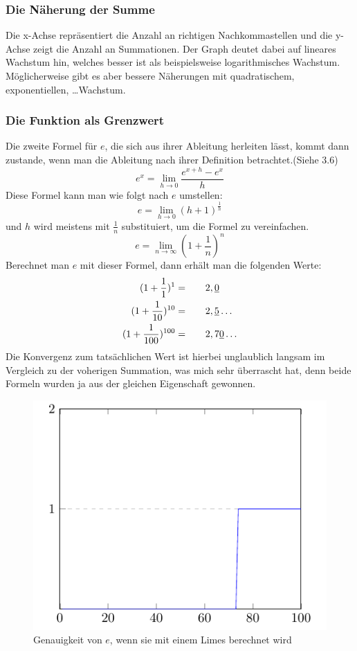 \subsubsection{Die Näherung der Summe}
\par Die x-Achse repräsentiert die Anzahl an richtigen Nachkommastellen und die y-Achse zeigt die Anzahl an Summationen. Der Graph deutet dabei auf lineares Wachstum hin, welches besser ist als beispielsweise logarithmisches Wachstum. Möglicherweise gibt es aber bessere Näherungen mit quadratischem, exponentiellen, \dots Wachstum.
\subsubsection{Die Funktion als Grenzwert}
Die zweite Formel für $e$, die sich aus ihrer Ableitung herleiten lässt, kommt dann zustande, wenn man die Ableitung nach ihrer Definition betrachtet.(Siehe 3.6)\[
e^x = \lim_{h\to0} \frac{e^{x+h}-e^x}{h}\]
Diese Formel kann man wie folgt nach $e$ umstellen:\[
e = \lim_{h\to0} (h + 1)^{\frac{1}{h}}\] 
und $h$ wird meistens mit $\frac{1}{n}$ substituiert, um die Formel zu vereinfachen.\[
e = \lim_{n\to\infty} (1+\frac{1}{n})^n\]
Berechnet man $e$ mit dieser Formel, dann erhält man die folgenden Werte: \[
  \begin{aligned}
  (1+\frac{1}{1})^1 = \indent\crel{2},\underline{0}\\
  (1+\frac{1}{10})^{10} =  \indent\crel{2},\underline{5}\dots\\
  (1+\frac{1}{100})^{100} = \indent\crel{2},7\underline{0}\dots
\end{aligned} \]
Die Konvergenz zum tatsächlichen Wert ist hierbei unglaublich langsam im Vergleich zu der voherigen Summation, was mich sehr überrascht hat, denn beide Formeln wurden ja aus der gleichen Eigenschaft gewonnen.
\begin{figure}[h]
  \includegraphics{medien2/limes/limes.pdf}
  \centering
  \caption{Genauigkeit von $e$, wenn sie mit einem Limes berechnet wird}
\end{figure}
